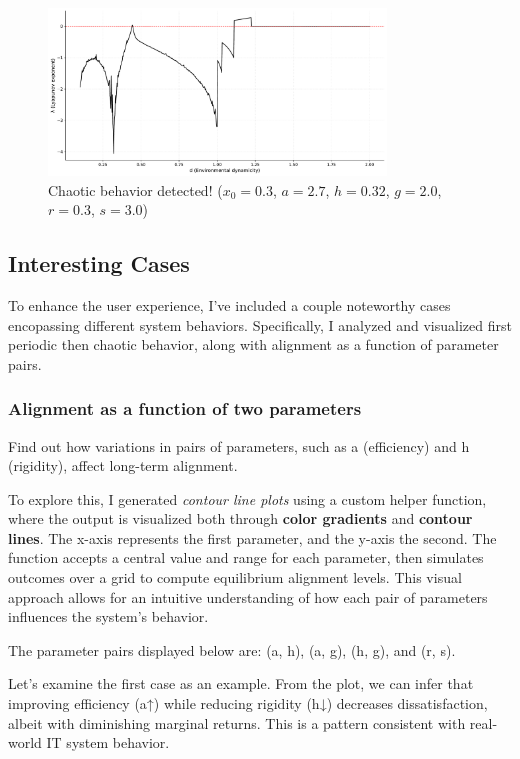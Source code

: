 \documentclass[a4paper, 10pt]{article}
\begin{document}
\begin{figure}[H]
	\centering
	\includegraphics[width=0.8\textwidth]{../images/results/lyapunov.pdf}
	\caption{Chaotic behavior detected! ($x_0 = 0.3$, $a = 2.7$, $h = 0.32$, $g = 2.0$, $r = 0.3$, $s = 3.0$)}
	\label{fig:lyapunov}
\end{figure}

\clearpage

\subsection{Interesting Cases}
To enhance the user experience, I've included a couple noteworthy cases encopassing different system behaviors. Specifically, I analyzed and visualized first periodic then chaotic behavior, along with alignment as a function of parameter pairs.

\subsubsection{Alignment as a function of two parameters}
Find out how variations in pairs of parameters, such as a (efficiency) and h (rigidity), affect long-term alignment.

To explore this, I generated \textit{contour line plots} using a custom helper function, where the output is visualized both through \textbf{color gradients} and \textbf{contour lines}.
The x-axis represents the first parameter, and the y-axis the second. The function accepts a central value and range for each parameter, then simulates outcomes over a grid to compute equilibrium alignment levels. This visual approach allows for an intuitive understanding of how each pair of parameters influences the system’s behavior.

The parameter pairs displayed below are: (a, h), (a, g), (h, g), and (r, s).

Let’s examine the first case as an example. From the plot, we can infer that improving efficiency (a↑) while reducing rigidity (h↓) decreases dissatisfaction, albeit with diminishing marginal returns.  
This is a pattern consistent with real-world IT system behavior.
\end{document}
